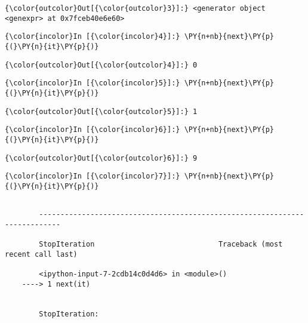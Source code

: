 \begin{Verbatim}[commandchars=\\\{\}]
{\color{outcolor}Out[{\color{outcolor}3}]:} <generator object <genexpr> at 0x7fceb40e6e60>
\end{Verbatim}
            
    \begin{Verbatim}[commandchars=\\\{\}]
{\color{incolor}In [{\color{incolor}4}]:} \PY{n+nb}{next}\PY{p}{(}\PY{n}{it}\PY{p}{)}
\end{Verbatim}


\begin{Verbatim}[commandchars=\\\{\}]
{\color{outcolor}Out[{\color{outcolor}4}]:} 0
\end{Verbatim}
            
    \begin{Verbatim}[commandchars=\\\{\}]
{\color{incolor}In [{\color{incolor}5}]:} \PY{n+nb}{next}\PY{p}{(}\PY{n}{it}\PY{p}{)}
\end{Verbatim}


\begin{Verbatim}[commandchars=\\\{\}]
{\color{outcolor}Out[{\color{outcolor}5}]:} 1
\end{Verbatim}
            
    \begin{Verbatim}[commandchars=\\\{\}]
{\color{incolor}In [{\color{incolor}6}]:} \PY{n+nb}{next}\PY{p}{(}\PY{n}{it}\PY{p}{)}
\end{Verbatim}


\begin{Verbatim}[commandchars=\\\{\}]
{\color{outcolor}Out[{\color{outcolor}6}]:} 9
\end{Verbatim}
            
    \begin{Verbatim}[commandchars=\\\{\}]
{\color{incolor}In [{\color{incolor}7}]:} \PY{n+nb}{next}\PY{p}{(}\PY{n}{it}\PY{p}{)}
\end{Verbatim}


    \begin{Verbatim}[commandchars=\\\{\}]

        ---------------------------------------------------------------------------

        StopIteration                             Traceback (most recent call last)

        <ipython-input-7-2cdb14c0d4d6> in <module>()
    ----> 1 next(it)
    

        StopIteration: 

    \end{Verbatim}

